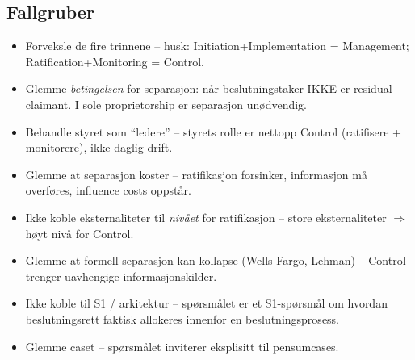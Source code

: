 \subsection*{Fallgruber}
\begin{itemize}\setlength{\itemsep}{2pt}
\item Forveksle de fire trinnene -- husk: Initiation+Implementation = Management; Ratification+Monitoring = Control.
\item Glemme \emph{betingelsen} for separasjon: når beslutningstaker IKKE er residual claimant. I sole proprietorship er separasjon unødvendig.
\item Behandle styret som ``ledere'' -- styrets rolle er nettopp Control (ratifisere + monitorere), ikke daglig drift.
\item Glemme at separasjon koster -- ratifikasjon forsinker, informasjon må overføres, influence costs oppstår.
\item Ikke koble eksternaliteter til \emph{nivået} for ratifikasjon -- store eksternaliteter $\Rightarrow$ høyt nivå for Control.
\item Glemme at formell separasjon kan kollapse (Wells Fargo, Lehman) -- Control trenger uavhengige informasjonskilder.
\item Ikke koble til S1 / arkitektur -- spørsmålet er et S1-spørsmål om hvordan beslutningsrett faktisk allokeres innenfor en beslutningsprosess.
\item Glemme caset -- spørsmålet inviterer eksplisitt til pensumcases.
\end{itemize}

\FloatBarrier
